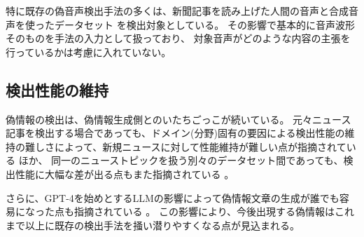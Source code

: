 特に既存の偽音声検出手法の多くは、新聞記事を読み上げた人間の音声と合成音声を使ったデータセット \cite{wu15e_interspeech,WANG2020101114}を検出対象としている。
その影響で基本的に音声波形そのものを手法の入力として扱っており、
対象音声がどのような内容の主張を行っているかは考慮に入れていない。

\subsection{検出性能の維持}
偽情報の検出は、偽情報生成側とのいたちごっこが続いている。
元々ニュース記事を検出する場合であっても、ドメイン(分野)固有の要因による検出性能の維持の難しさによって、新規ニュースに対して性能維持が難しい点が指摘されている \cite{10.1145/3459637.3482139}ほか、
同一のニューストピックを扱う別々のデータセット間であっても、検出性能に大幅な差が出る点もまた指摘されている \cite{10.1007/978-3-030-73696-5_13}。

さらに、GPT-4を始めとするLLMの影響によって偽情報文章の生成が誰でも容易になった点も指摘されている \cite{DWIVEDI2023102642}。
この影響により、今後出現する偽情報はこれまで以上に既存の検出手法を掻い潜りやすくなる点が見込まれる。

